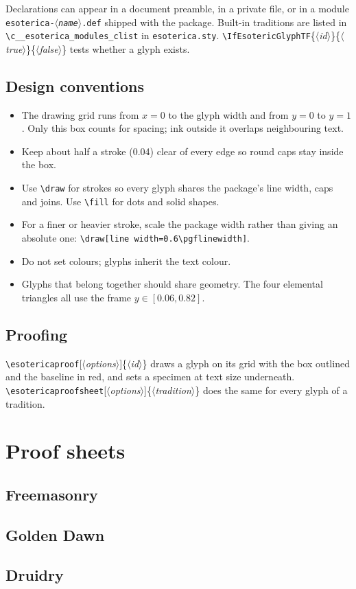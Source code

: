 \documentclass[11pt]{article}
\newcommand\cs[1]{\texttt{\textbackslash#1}}
\newcommand\meta[1]{\ensuremath{\langle}\textit{#1}\ensuremath{\rangle}}
\newcommand\oarg[1]{[\meta{#1}]}
\begin{document}
\noindent Declarations can appear in a document preamble, in a private file,
or in a module \texttt{esoterica-\meta{name}.def} shipped with the package.
Built-in traditions are listed in \verb|\c__esoterica_modules_clist| in
\texttt{esoterica.sty}.  \cs{IfEsotericGlyphTF}\{\meta{id}\}\{\meta{true}\}\{\meta{false}\}
tests whether a glyph exists.

\subsection{Design conventions}

\begin{itemize}
  \item The drawing grid runs from $x=0$ to the glyph width and from $y=0$ to
    $y=1$.  Only this box counts for spacing; ink outside it overlaps
    neighbouring text.
  \item Keep about half a stroke (0.04) clear of every edge so round caps
    stay inside the box.
  \item Use \verb|\draw| for strokes so every glyph shares the package's
    line width, caps and joins.  Use \verb|\fill| for dots and solid shapes.
  \item For a finer or heavier stroke, scale the package width rather than
    giving an absolute one: \verb|\draw[line width=0.6\pgflinewidth]|.
  \item Do not set colours; glyphs inherit the text colour.
  \item Glyphs that belong together should share geometry.  The four
    elemental triangles all use the frame $y\in[0.06,0.82]$.
\end{itemize}

\subsection{Proofing}

\cs{esotericaproof}\oarg{options}\{\meta{id}\} draws a glyph on its grid with
the box outlined and the baseline in red, and sets a specimen at text size
underneath.  \cs{esotericaproofsheet}\oarg{options}\{\meta{tradition}\} does the
same for every glyph of a tradition.

\begin{center}
  \qquad
\end{center}

\section{Proof sheets}

\subsection{Freemasonry}
\subsection{Golden Dawn}
\subsection{Druidry}
\end{document}
